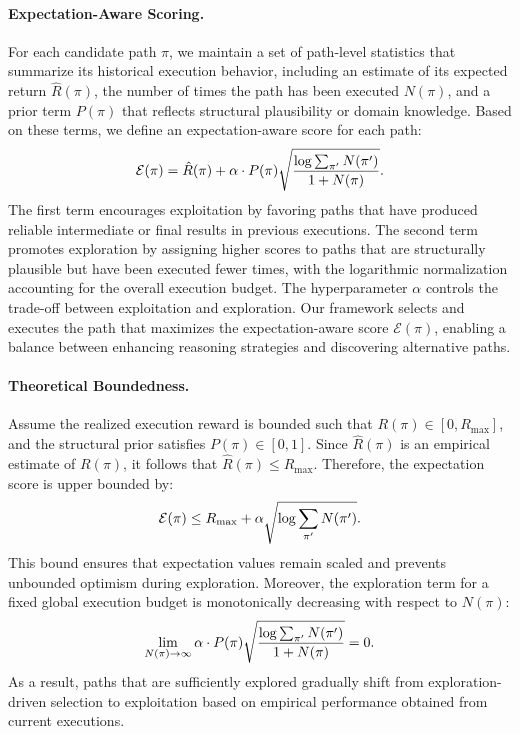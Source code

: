 \paragraph{Expectation-Aware Scoring.}

For each candidate path $\pi$, we maintain a set of path-level statistics that summarize its historical execution behavior, including an estimate of its expected return $\hat{R}(\pi)$, the number of times the path has been executed $N(\pi)$, and a prior term $P(\pi)$ that reflects structural plausibility or domain knowledge. Based on these terms, we define an expectation-aware score for each path:
\begin{equation}\small
\mathcal{E}(\pi)
=
\hat{R}(\pi)
+
\alpha \cdot P(\pi)
\sqrt{
\frac{\log \sum_{\pi'} N(\pi')}{1 + N(\pi)}
}.
\end{equation}
The first term encourages exploitation by favoring paths that have produced reliable intermediate or final results in previous executions. The second term promotes exploration by assigning higher scores to paths that are structurally plausible but have been executed fewer times, with the logarithmic normalization accounting for the overall execution budget. The hyperparameter $\alpha$ controls the trade-off between exploitation and exploration. Our framework selects and executes the path that maximizes the expectation-aware score $\mathcal{E}(\pi)$, enabling a balance between enhancing reasoning strategies and discovering alternative paths.


\paragraph{Theoretical Boundedness.}
Assume the realized execution reward is bounded such that $R(\pi) \in [0, R_{\max}]$, and the structural prior satisfies $P(\pi) \in [0,1]$. Since $\hat{R}(\pi)$ is an empirical estimate of $R(\pi)$, it follows that
$\hat{R}(\pi) \le R_{\max}$. Therefore, the expectation score is upper bounded by:
\begin{equation}\small
\mathcal{E}(\pi)
\le
R_{\max}
+
\alpha \sqrt{\log \sum_{\pi'} N(\pi')}.
\vspace{-1mm}
\end{equation}
This bound ensures that expectation values remain scaled and prevents unbounded optimism during exploration. Moreover, the exploration term for a fixed global execution budget is monotonically decreasing with respect to $N(\pi)$:
\begin{equation}\small
\lim_{N(\pi) \to \infty}
\alpha \cdot P(\pi)
\sqrt{
\frac{\log \sum_{\pi'} N(\pi')}{1 + N(\pi)}
}
= 0.
\end{equation}
As a result, paths that are sufficiently explored gradually shift from exploration-driven selection to exploitation based on empirical performance obtained from current executions.


